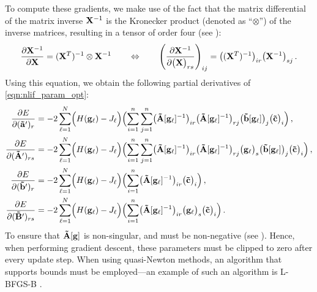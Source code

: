 To compute these gradients, we make use of the fact that the matrix differential of the matrix inverse $\mathbf{X}^{-1}$ is the Kronecker product (denoted as \enquote{$\otimes$}) of the inverse matrices, resulting in a tensor of order four (see \cite[Section~10.6, eq.~1, p.~198]{lutkepohl1997handbook}):
\begin{align}
	\frac{\partial \mathbf{X}^{-1}}{\partial \mathbf{X}}
		= (\mathbf{X}^T)^{-1} \otimes \mathbf{X}^{-1}
	\quad \quad \Leftrightarrow \quad \quad
	\left( \frac{\partial \mathbf{X}^{-1}}{\partial \bigl(\mathbf{X}\bigr)_{rs}} \right)_{ij} =
		\bigl((\mathbf{X}^T)^{-1}\bigr)_{ir} \bigl(\mathbf{X}^{-1}\bigr)_{sj} \,.
	\label{eqn:inverse_differential_tensor}
\end{align}
Using this equation, we obtain the following partial derivatives of \cref{eqn:nlif_param_opt}:%
\begin{align}
	\frac{\partial E}{\partial (\vrap)_{r}} &=
	-2 \sum_{\ell = 1}^N
	\Bigl(H(\vec g_\ell) - J_\ell \Bigr)
   	\Bigl(
   	\sum_{i = 1}^n \sum_{j = 1}^n \bigl( \mrA[\vec g_\ell]^{-1} \bigr)_{ir} \bigl( \mrA[\vec g_\ell]^{-1} \bigr)_{r j} \bigl( \vrb[\vec g_\ell] \bigr)_j \bigl(\vrc\bigr)_i
   	\Bigr) \label{eqn:nlif_parm_grad_a} \,,\\%
%
	\frac{\partial E}{\partial (\mrAp)_{rs}} &=
	-2 \sum_{\ell = 1}^N
	\Bigl(H(\vec g_\ell) - J_\ell \Bigr)
   	\Bigl(
   	\sum_{i = 1}^n \sum_{j = 1}^n \bigl( \mrA[\vec g_\ell]^{-1} \bigr)_{i r} \bigl( \mrA[\vec g_\ell]^{-1} \bigr)_{r j}  \bigl(\vec g_\ell\bigr)_s \bigl( \vrb[\vec g_\ell] \bigr)_j \bigl(\vrc\bigr)_i
   	\Bigr) \label{eqn:nlif_parm_grad_A} \,, \\%
%
	\frac{\partial E}{\partial (\vrbp)_{r}} &=
	-2 \sum_{\ell = 1}^N
	\Bigl(H(\vec g_\ell) - J_\ell \Bigr)
   	\Bigl(
   	\sum_{i=1}^n 
   	 \bigl( \mrA[\vec g_\ell]^{-1} \bigr)_{ir} \bigl(\vrc\bigr)_i
   	\Bigr) \label{eqn:nlif_parm_grad_b} \,, \\%
%
	\frac{\partial E}{\partial (\mrBp)_{rs}} &=
	-2 \sum_{\ell = 1}^N
	\Bigl(H(\vec g_\ell) - J_\ell \Bigr)
   	\Bigl(
   	\sum_{i=1}^n 
   	 \bigl( \mrA[\vec g_\ell]^{-1} \bigr)_{ir} \bigl( \vec g_\ell \bigr)_s \bigl(\vrc\bigr)_i
   	\Bigr) \label{eqn:nlif_parm_grad_B}\,.
\end{align}
To ensure that $\mathbf{\tilde A}[\mathbf{g}]$ is non-singular, \vrap and \mrAp must be non-negative (see ).
Hence, when performing gradient descent, these parameters must be clipped to zero after every update step.
When using quasi-Newton methods, an algorithm that supports bounds must be employed---an example of such an algorithm is L-BFGS-B \citep{byrd1995limited}.

